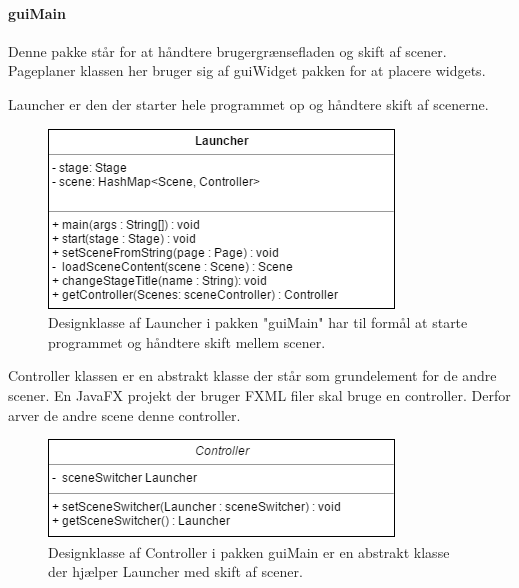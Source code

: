 \paragraph{guiMain}
Denne pakke står for at håndtere brugergrænsefladen og skift af scener. Pageplaner klassen her bruger sig af guiWidget pakken for at placere widgets.

Launcher er den der starter hele programmet op og håndtere skift af scenerne.
      \begin{figure}[H]
      \includegraphics[width=\linewidth]{elaborationsdokumentet/figurer/design/designklasser/Designklasse-Launcher.png}
      \caption{Designklasse af Launcher i pakken "guiMain" har til formål at starte programmet og håndtere skift mellem scener.}
      \label{Designklasse-Launcher}
  \end{figure}
  
Controller klassen er en abstrakt klasse der står som grundelement for de andre scener. En JavaFX projekt der bruger FXML filer skal bruge en controller. Derfor arver de andre scene denne controller. 
      \begin{figure}[H]
      \includegraphics[width=\linewidth]{elaborationsdokumentet/figurer/design/designklasser/Designklasse-Controller.png}
      \caption{Designklasse af Controller i pakken guiMain er en abstrakt klasse der hjælper Launcher med skift af scener.}
      \label{Designklasse-Controller}
  \end{figure}

